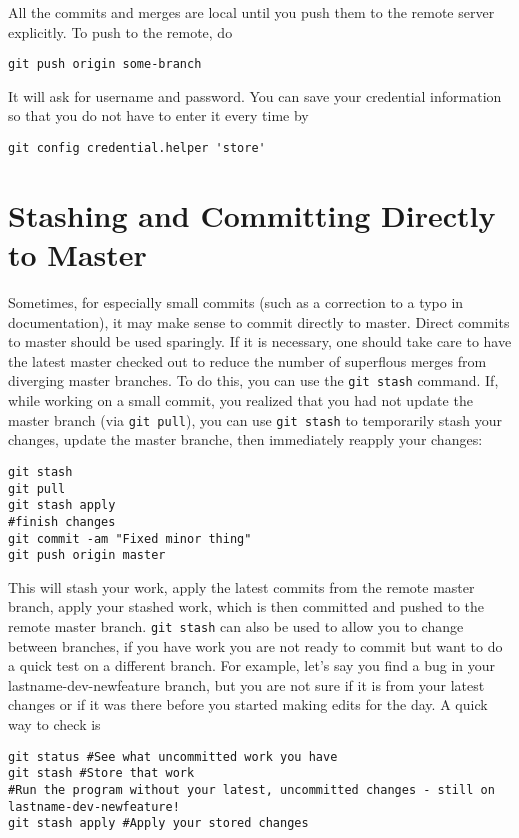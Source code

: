 \documentclass[runningheads,letterpaper]{llncs}
\begin{document}
All the commits and merges are local until you push them to the remote server explicitly.
To push to the remote, do
\begin{verbatim}
git push origin some-branch
\end{verbatim}
It will ask for username and password.
You can save your credential information so that you do not have to enter it every time by
\begin{verbatim}
git config credential.helper 'store'
\end{verbatim}


\section{Stashing and Committing Directly to Master}
Sometimes, for especially small commits (such as a correction to a typo in documentation),
it may make sense to commit directly to master. Direct commits to master should be used sparingly.
If it is necessary, one should take care to have the latest master checked out to 
reduce the number of superflous merges from diverging master branches. To do this,
you can use the {\tt git stash} command. If, while working on a small commit, you realized
that you had not update the master branch (via {\tt git pull}), you can use {\tt git stash} to
temporarily stash your changes, update the master branche, then immediately reapply your changes:
\begin{verbatim}
git stash
git pull
git stash apply
#finish changes
git commit -am "Fixed minor thing"
git push origin master
\end{verbatim}

This will stash your work, apply the latest commits from the remote master branch, apply your stashed
work, which is then committed and pushed to the remote master branch. {\tt git stash} can also
be used to allow you to change between branches, if you have work you are not ready to commit
but want to do a quick test on a different branch. For example, let's say you find a bug
in your lastname-dev-newfeature branch, but you are not sure if it is from your latest changes
or if it was there before you started making edits for the day. A quick way to check is
\begin{verbatim}
git status #See what uncommitted work you have
git stash #Store that work
#Run the program without your latest, uncommitted changes - still on lastname-dev-newfeature!
git stash apply #Apply your stored changes
\end{verbatim}
\end{document}
